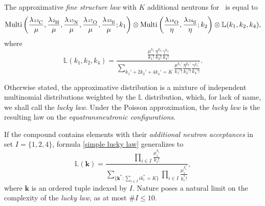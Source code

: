 \begin{result}\label{Fine structure law}
	The approximative \emph{fine structure law} with $K$ additional neutrons for \molecule\, is equal to 
	{\small
		\begin{equation*}
			\mathrm{Multi} \left(
				\frac{ \lambda_\cem{^{13}C} }{ \mu }, 
				\frac{ \lambda_\cem{^{2} H} }{ \mu }, 
				\frac{ \lambda_\cem{^{15}N} }{ \mu },
				\frac{ \lambda_\cem{^{17}O} }{ \mu }, 
				\frac{ \lambda_\cem{^{33}S} }{ \mu }; 
				k_1
			\right ) \otimes
			\mathrm{Multi} \left(
				\frac{ \lambda_\cem{^{18}O} }{ \eta },
				\frac{ \lambda_\cem{^{34}S} }{ \eta }; 
				k_2	
			\right) \otimes 
			\mathbb{L}( k_1, k_2, k_4 ),
		\end{equation*}
	}
	where 
	\begin{equation}\label{simple lucky law}
		\mathbb{L}( k_1, k_2, k_4 ) = 
		\frac{ \frac{ \mu^{k_1} }{ k_1! } \frac{ \eta^{k_2}}{ k_2! } \frac{ \gamma^{k_4} }{ k_4! } }{ 
			\underset{ k_1' + 2 k_2' + 4 k_4' = K}{\sum} 
				\frac{ \mu^{k_1'} }{ k_1'! } 
				\frac{ \eta^{k_2'}}{ k_2'! } 
				\frac{ \gamma^{k_4'}}{ k_4'! }
		}.
	\end{equation}
\end{result}

Otherwise stated, the approximative distribution is a mixture of independent multinomial distributions weighted by the $\mathbb{L}$ distribution, which, for lack of name, we shall call the {\it lucky law}. Under the Poisson approximation, the {\it lucky law} is the resulting law on the {\it equatransneutronic configurations}.

If the compound contains elements with their {\it additional neutron acceptances} in set $I = \{ 1, 2, 4\}$, formula \eqref{simple lucky law} generalizes to 
\begin{equation*}
	\mathbb{L}( \bm{k} ) = 
	\frac{ 
		\prod_{i \in I} \frac{ \mu_i^{k_i} }{ {k_i}! } 
	}{ 
		\underset{ \{ \bm{k}^* :  \sum_{i \in I} i k_i^*  = K \} }{\sum} 	
		\prod_{i \in I} \frac{ \mu_i^{k_i^*} }{ {k_i^*}! }	
	},
\end{equation*}
where $\bm{k}$ is an ordered tuple indexed by $I$. Nature poses a natural limit on the complexity of the {\it lucky law}, as at most  $\# I \leq 10$.